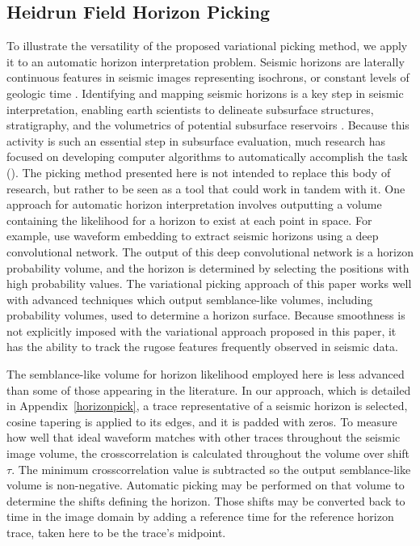 \subsection{Heidrun Field Horizon Picking}
To illustrate the versatility of the proposed variational picking method, we apply it to an automatic horizon interpretation problem.  Seismic horizons are laterally continuous features in seismic images representing isochrons, or constant levels of geologic time \cite[]{vail-1977}.
  Identifying and mapping seismic horizons is a key step in seismic interpretation, enabling earth scientists to delineate subsurface structures, stratigraphy, and the volumetrics of potential subsurface reservoirs \cite[]{wu-2013}.  Because this activity is such an essential step in subsurface evaluation, much research has focused on developing computer algorithms to automatically accomplish the task (\citealp{lomask2006flattening,fomel2010predictive,hoyes2011review,wu2015horizon,wu2018least,xue2018predictive,peters2019multiresolution}).  The picking method presented here is not intended to replace this body of research, but rather to be seen as a tool that could work in tandem with it.  One approach for automatic horizon interpretation involves outputting a volume containing the likelihood for a horizon to exist at each point in space.  For example, \cite{shi-2020} use waveform embedding to extract seismic horizons using a deep convolutional network.  The output of this deep convolutional network is a horizon probability volume, and the horizon is determined by selecting the positions with high probability values.  The variational picking approach of this paper works well with advanced techniques which output semblance-like volumes, including probability volumes, used to determine a horizon surface.  Because smoothness is not explicitly imposed with the variational approach proposed in this paper, it has the ability to track the rugose features frequently observed in seismic data.

The semblance-like volume for horizon likelihood employed here is less advanced than some of those appearing in the literature.  In our approach, which is detailed in Appendix~\ref{horizonpick}, a trace representative of a seismic horizon is selected, cosine tapering is applied to its edges, and it is padded with zeros.  To measure how well that ideal waveform matches with other traces throughout the seismic image volume, the crosscorrelation is calculated throughout the volume over shift $\tau$. The minimum crosscorrelation value is subtracted so the output semblance-like volume is non-negative.  Automatic picking may be performed on that volume to determine the shifts defining the horizon.  Those shifts may be converted back to time in the image domain by adding a reference time for the reference horizon trace, taken here to be the trace's midpoint.


